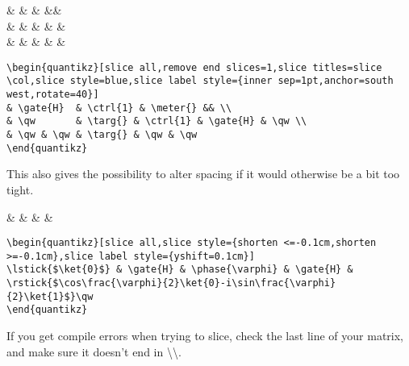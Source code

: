\documentclass[aps,pra,10pt,nofootinbib]{revtex4}
\begin{document}
\begin{Code}
\begin{center}
\begin{quantikz}[slice all,remove end slices=1,slice titles=slice \col,slice style=blue,slice label style={inner sep=1pt,anchor=south west,rotate=40}]
&  &  & \meter{} && \\
& \qw       & \targ{} &  &  & \qw \\
& \qw & \qw & \targ{} & \qw & \qw
\end{quantikz}
\end{center}
\tcblower
\begin{lstlisting}
\begin{quantikz}[slice all,remove end slices=1,slice titles=slice \col,slice style=blue,slice label style={inner sep=1pt,anchor=south west,rotate=40}]
& \gate{H}  & \ctrl{1} & \meter{} && \\
& \qw       & \targ{} & \ctrl{1} & \gate{H} & \qw \\
& \qw & \qw & \targ{} & \qw & \qw
\end{quantikz}
\end{lstlisting}
\end{Code}
\noindent This also gives the possibility to alter spacing if it would otherwise be a bit too tight.
\begin{Code}
\begin{center}
\begin{quantikz}[slice all,slice style={shorten <=-0.1cm,shorten >=-0.1cm},slice label style={yshift=0.1cm}]
 &  & \phase{\varphi} &  & \qw
\end{quantikz}
\end{center}
\tcblower
\begin{lstlisting}
\begin{quantikz}[slice all,slice style={shorten <=-0.1cm,shorten >=-0.1cm},slice label style={yshift=0.1cm}]
\lstick{$\ket{0}$} & \gate{H} & \phase{\varphi} & \gate{H} & \rstick{$\cos\frac{\varphi}{2}\ket{0}-i\sin\frac{\varphi}{2}\ket{1}$}\qw
\end{quantikz}
\end{lstlisting}
\end{Code}
\noindent If you get compile errors when trying to slice, check the last line of your matrix, and make sure it doesn't end in \textbackslash\textbackslash.
\end{document}

